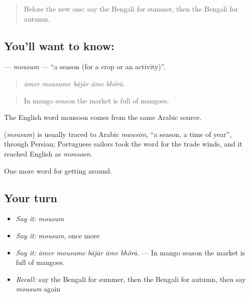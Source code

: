 \label{lesson:BN-C427-mousum}



\begin{quote}
Before the new one: say the Bengali for summer, then the Bengali for autumn.
\end{quote}

\subsection*{You'll want to know: }
\textbf{} — \emph{mousum} — \textquotedblleft{}a season (for a crop or an activity)\textquotedblright{}.

\begin{quote}
    
\end{quote}

\begin{quote}
\emph{āmer mousume bājār āme bhôrā.}
\end{quote}

\begin{quote}
In mango season the market is full of mangoes.
\end{quote}

The English word monsoon comes from the same Arabic source.

\begin{cousinweb}
\textbf{} (\emph{mousum}) is usually traced to Arabic \emph{mawsim}, \textquotedblleft{}a season, a time of year\textquotedblright{}, through Persian; Portuguese sailors took the word for the trade winds, and it reached English as \emph{monsoon}.
\end{cousinweb}

\begin{grammarlens}[title={What you've built}]
One more word for getting around.
\end{grammarlens}

\subsection*{Your turn}
\begin{itemize}
\raggedright
  \item \emph{Say it:} \emph{mousum}
  \item \emph{Say it:} \emph{mousum}, once more
  \item \emph{Say it:} \emph{āmer mousume bājār āme bhôrā.} — In mango season the market is full of mangoes.
  \item \emph{Recall:} say the Bengali for summer, then the Bengali for autumn, then say \emph{mousum} again
\end{itemize}

